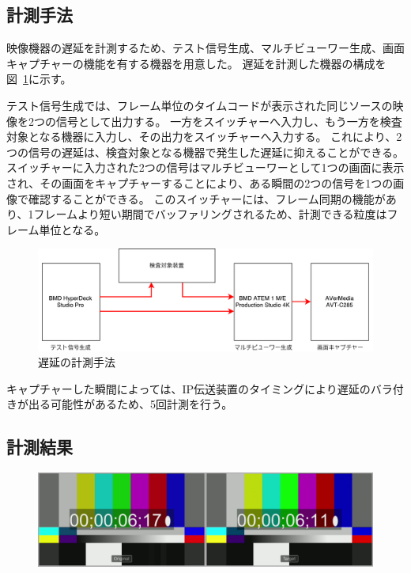 \subsection{計測手法}

映像機器の遅延を計測するため、テスト信号生成、マルチビューワー生成、画面キャプチャーの機能を有する機器を用意した。
遅延を計測した機器の構成を図~\ref{fig:evaluate-diagram}に示す。

テスト信号生成では、フレーム単位のタイムコードが表示された同じソースの映像を2つの信号として出力する。
一方をスイッチャーへ入力し、もう一方を検査対象となる機器に入力し、その出力をスイッチャーへ入力する。
これにより、2つの信号の遅延は、検査対象となる機器で発生した遅延に抑えることができる。
スイッチャーに入力された2つの信号はマルチビューワーとして1つの画面に表示され、その画面をキャプチャーすることにより、ある瞬間の2つの信号を1つの画像で確認することができる。
このスイッチャーには、フレーム同期の機能があり、1フレームより短い期間でバッファリングされるため、計測できる粒度はフレーム単位となる。

\begin{figure}[htbp]
  \begin{center}
    \includegraphics[bb=0 0 697 212,width=15cm]{img/evaluate-diagram.pdf}
  \end{center}
  \caption{遅延の計測手法}
  \label{fig:evaluate-diagram}
\end{figure}

キャプチャーした瞬間によっては、IP伝送装置のタイミングにより遅延のバラ付きが出る可能性があるため、5回計測を行う。

\subsection{計測結果}

\begin{figure}[htbp]
  \begin{center}
    \includegraphics[bb=0 0 1920 540,width=14cm]{img/evaluate-delay-software-1.png}
  \end{center}
  \caption[ソフトウェア実装による1回目の遅延計測のキャプチャー画像]{}
  \label{fig:evaluate-delay-software-1}
\end{figure}

